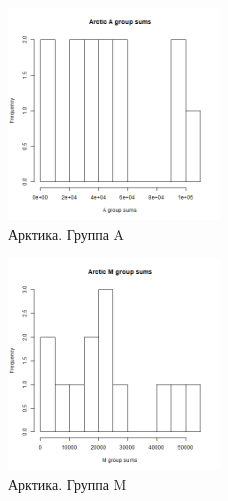 \begin{figure}[!htb]
    \centering
    \includegraphics[width=0.5\textwidth]{fig/Arctic_A.png}
    \caption{Арктика. Группа A}
\end{figure}
\newpage
\begin{figure}[!htb]
    \centering
    \includegraphics[width=0.5\textwidth]{fig/Arctic_M.png}
    \caption{Арктика. Группа M}
\end{figure}

